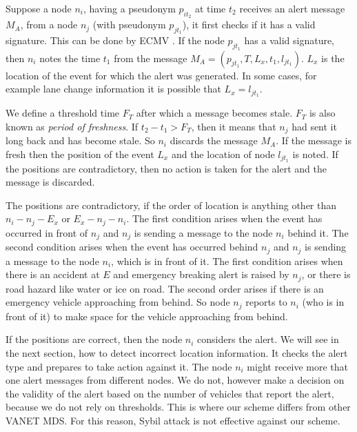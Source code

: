 \documentclass[conference]{IEEEtran}[10pt]
\begin{document}
Suppose a node $n_i$, having a pseudonym $p_{it_2}$ at time $t_2$ receives an alert message $M_A$, 
from a node $n_j$ (with pseudonym $p_{jt_1}$), it first checks if it has a valid signature. 
This can be done by ECMV \cite{WJS08}. 
If the node $p_{jt_1}$ has a valid signature, then $n_i$ notes the time $t_1$ from the message $M_A = (p_{jt_1},T,L_x,t_1,l_{jt_1})$. 
$L_x$ is the location of the event for which the alert was generated. In some cases, for example
lane change information it is possible that $L_x = l_{jt_1}$. 

We define a threshold time $F_T$ after which a message becomes stale. 
$F_T$ is also known as \emph{period of freshness}. 
If $t_2-t_1 > F_T$, then it means that $n_j$ had sent it long back and has  become stale. 
So $n_i$ discards the message $M_A$. 
If the message is fresh then the position of the event $L_x$ and the location of node $l_{jt_1}$ is noted. 
If the positions are contradictory, then no action is taken for the alert and the message is discarded. 

The positions are contradictory, if the order of location is anything other than 
$n_i-n_j-E_x$ or $E_x-n_j-n_i$. 
The first condition arises when the event has occurred in front of $n_j$ and $n_j$ is sending a message to the node $n_i$ behind it. 
The second condition arises when the event has occurred  behind $n_j$ and $n_j$ is sending a message to the node $n_i$, which is in front of it. 
The first condition arises when there is an accident at $E$ and emergency breaking alert is raised by $n_j$, 
or there is road hazard like water or ice on road. 
The second order arises if there is an emergency vehicle approaching from behind. 
So node $n_j$ reports to $n_i$ (who is in front of it) to make space for the vehicle approaching from behind. 
 
If the positions are correct, then the node $n_i$ considers the alert.
We will see in the next section, how to detect incorrect location information. 
It checks the alert type and prepares to take action against it. 
The node $n_i$ might receive more that one alert messages from different nodes.
We do not, however make a decision on the validity of the alert based on the number of vehicles 
that report the alert, because we do not rely on thresholds.
This is where our scheme differs from other VANET MDS. 
For this reason, Sybil attack is not effective against our scheme. 
\end{document}
